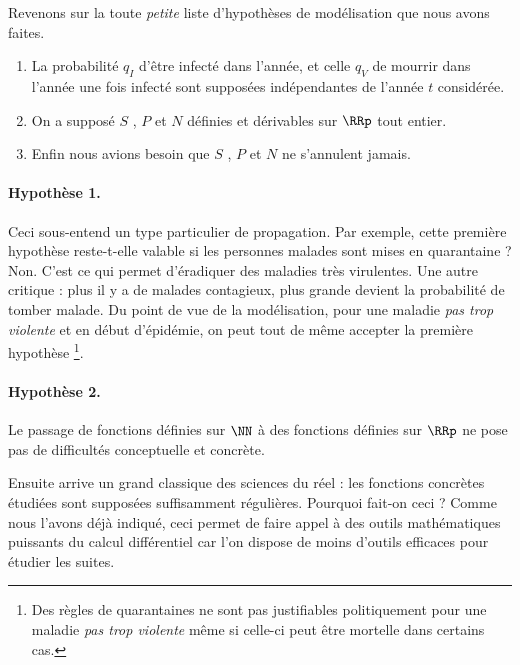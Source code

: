 Revenons sur la toute \emph{\og petite \fg} liste d'hypothèses de modélisation que nous avons faites.

\begin{enumerate}
	\item La probabilité $q_I$ d'être infecté dans l'année, et celle $q_V$ de mourrir dans l'année une fois infecté sont supposées indépendantes de l'année $t$ considérée.

	\item On a supposé $S$ , $P$ et $N$ définies et dérivables sur $\RRp$ tout entier.

	\item Enfin nous avions besoin que $S$ , $P$ et $N$ ne s'annulent jamais.
\end{enumerate}




\paragraph{Hypothèse 1.} Ceci sous-entend un type particulier de propagation.
Par exemple, cette première hypothèse reste-t-elle valable si les personnes malades sont mises en quarantaine ? Non. C'est ce qui permet d'éradiquer des maladies très virulentes.
Une autre critique : plus il y a de malades contagieux, plus grande devient la probabilité de tomber malade. 
Du point de vue de la modélisation, pour une maladie \emph{\og pas trop violente \fg} et en début d'épidémie, on peut tout de même accepter la première hypothèse
\footnote{
	Des règles de quarantaines ne sont pas justifiables politiquement pour une maladie \emph{\og pas trop violente \fg} même si celle-ci peut être mortelle dans certains cas.
}.




\paragraph{Hypothèse 2.} Le passage de fonctions définies sur $\NN$ à des fonctions définies sur $\RRp$ ne pose pas de difficultés conceptuelle et concrète. 

\smallskip

Ensuite arrive un grand classique des sciences du réel : les fonctions concrètes étudiées sont supposées suffisamment régulières. Pourquoi fait-on ceci ? Comme nous l'avons déjà indiqué, ceci permet de faire appel à des outils mathématiques puissants du calcul différentiel car l'on dispose de moins d'outils efficaces pour étudier les suites. 


